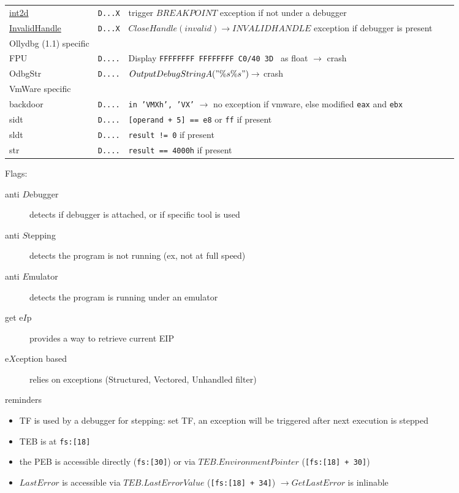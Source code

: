 \begin{tabular}{lllll}
\href{http://corkami.blogspot.com/2010/02/and-when-i-start-to-come-undone-stitch.html}
{int2d}			& {\tt D...X} & trigger $BREAKPOINT$ exception if not under a debugger\\
\href{http://corkami.blogspot.com/2010/02/and-when-i-start-to-come-undone-stitch.html}
{InvalidHandle}		& {\tt D...X} & $CloseHandle(invalid) \rightarrow INVALID HANDLE$ exception if debugger is present\\
\midrule
Ollydbg (1.1) specific \\
\midrule
FPU				& {\tt D....} & Display {\tt FFFFFFFF FFFFFFFF C0/40 3D } as float $\rightarrow$ crash \\
OdbgStr			& {\tt D....} & $OutputDebugStringA("\%s\%s") \rightarrow$ crash \\ 
\midrule
VmWare specific \\
\midrule
backdoor			& {\tt D....} & {\tt in 'VMXh', 'VX'} $\rightarrow$ no exception if vmware, else modified {\tt eax} and {\tt ebx} \\
sidt				& {\tt D....} & {\tt [operand + 5] == e8} or {\tt ff} if present \\
sldt				& {\tt D....} & {\tt result != 0} if present \\
str				& {\tt D....} & {\tt result == 4000h} if present \\
\bottomrule
\end{tabular}

\sig

\newpage

Flags:

\begin{description}
\item[anti $D$ebugger]
detects if debugger is attached, or if specific tool is used
\item[anti $S$tepping]
detects the program is not running (ex, not at full speed)
\item[anti $E$mulator]
detects the program is running under an emulator
\item[get e$I$p]
provides a way to retrieve current EIP
\item[e$X$ception based]
relies on exceptions (Structured, Vectored, Unhandled filter)
\end{description}

reminders
\begin{itemize}
\item
TF is used by a debugger for stepping: set TF, an exception will be triggered after next execution is stepped
\item
TEB is at {\tt fs:[18]}
\item
the PEB is accessible directly ({\tt fs:[30]}) or via $TEB.EnvironmentPointer$ ({\tt [fs:[18] + 30]})
\item
$LastError$ is accessible via $TEB.LastErrorValue$ ({\tt [fs:[18] + 34]}) $\rightarrow GetLastError$ is inlinable
\end{itemize}

\sig

